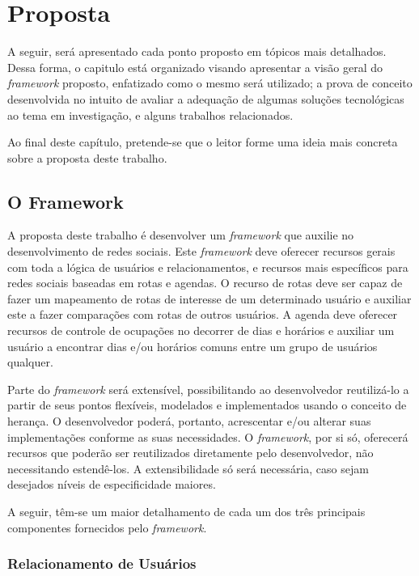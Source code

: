 \chapter{Proposta}
\label{chapter:Proposta}

A seguir, será apresentado cada ponto proposto em tópicos mais detalhados. Dessa forma, o capitulo está organizado visando apresentar a visão geral do \textit{framework} proposto, enfatizado como o mesmo será utilizado; a prova de conceito desenvolvida no intuito de avaliar a adequação de algumas soluções tecnológicas ao tema em investigação, e alguns trabalhos relacionados.

Ao final deste capítulo, pretende-se que o leitor forme uma ideia mais concreta sobre a proposta deste trabalho.

\section{O Framework}

A proposta deste trabalho é desenvolver um \textit{framework} que auxilie no desenvolvimento de redes sociais. Este \textit{framework} deve oferecer recursos gerais com toda a lógica de usuários e relacionamentos, e recursos mais específicos para redes sociais baseadas em rotas e agendas. O recurso de rotas deve ser capaz de fazer um mapeamento de rotas de interesse de um determinado usuário e auxiliar este a fazer comparações com rotas de outros usuários. A agenda deve oferecer recursos de controle de ocupações no decorrer de dias e horários e auxiliar um usuário a encontrar dias e/ou horários comuns entre um grupo de usuários qualquer.

Parte do \textit{framework} será extensível, possibilitando ao desenvolvedor reutilizá-lo a partir de seus pontos flexíveis, modelados e implementados usando o conceito de herança. O desenvolvedor poderá, portanto, acrescentar e/ou alterar suas implementações conforme as suas necessidades. O \textit{framework}, por si só, oferecerá recursos que poderão ser reutilizados diretamente pelo desenvolvedor, não necessitando estendê-los. A extensibilidade só será necessária, caso sejam desejados níveis de especificidade maiores.

A seguir, têm-se um maior detalhamento de cada um dos três principais componentes fornecidos pelo \textit{framework}.

\subsection{Relacionamento de Usuários}

